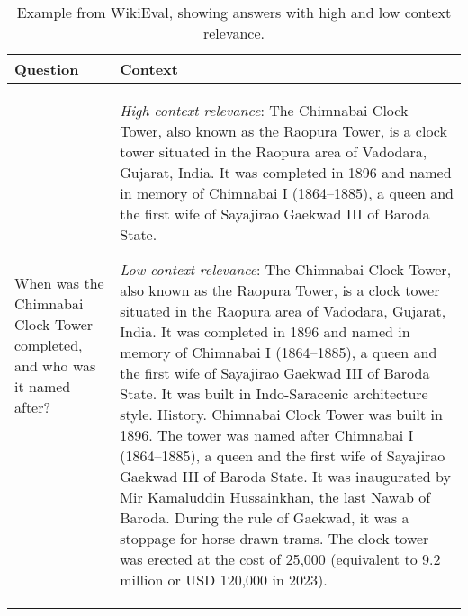 \documentclass[11pt]{article}
\begin{document}
\begin{table*}
\footnotesize
\centering
\begin{tabular}{p{90pt}p{330pt}}
\toprule
\textbf{Question} & \textbf{Context} \\
\midrule
When was the Chimnabai Clock Tower completed, and who was it named after?
& \textit{High context relevance}: The Chimnabai Clock Tower, also known as the Raopura Tower, is a clock tower situated in the Raopura area of Vadodara, Gujarat, India. It was completed in 1896 and named in memory of Chimnabai I (1864–1885), a queen and the first wife of Sayajirao Gaekwad III of Baroda State.

\smallskip
\textit{Low context relevance}: The Chimnabai Clock Tower, also known as the Raopura Tower, is a clock tower situated in the Raopura area of Vadodara, Gujarat, India. It was completed in 1896 and named in memory of Chimnabai I (1864–1885), a queen and the first wife of Sayajirao Gaekwad III of Baroda State. It was built in Indo-Saracenic architecture style. History. Chimnabai Clock Tower was built in 1896. The tower was named after Chimnabai I (1864–1885), a queen and the first wife of Sayajirao Gaekwad III of Baroda State. It was inaugurated by Mir Kamaluddin Hussainkhan, the last Nawab of Baroda. During the rule of Gaekwad, it was a stoppage for horse drawn trams. 
The clock tower was erected at the cost of 25,000 (equivalent to 9.2 million or USD 120,000 in 2023).\\
\bottomrule
\end{tabular}
\caption{Example from WikiEval, showing answers with high and low context relevance. \label{tabExamplesWikiEvalContextRelevance}}
\end{table*}
\end{document}
